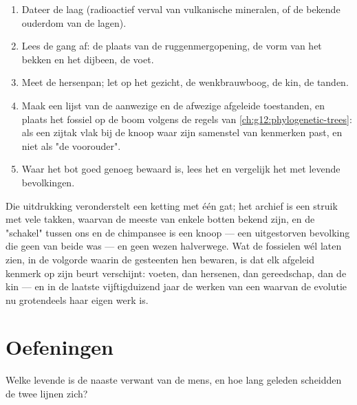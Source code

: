 \begin{method}\label{met:g12:human-evolution:placing}
\begin{enumerate}
  \item Dateer de laag (radioactief verval van vulkanische mineralen, of
        de bekende ouderdom van de lagen).
  \item Lees de gang af: de plaats van de ruggenmergopening, de vorm van
        het bekken en het dijbeen, de voet.
  \item Meet de hersenpan; let op het gezicht, de wenkbrauwboog, de kin,
        de tanden.
  \item Maak een lijst van de aanwezige en de afwezige afgeleide
        toestanden, en plaats het fossiel op de boom volgens de regels van
        \cref{ch:g12:phylogenetic-trees}: als een zijtak vlak bij de knoop
        waar zijn samenstel van kenmerken past, en niet als "de
        voorouder".
  \item Waar het bot goed genoeg bewaard is, lees het  en vergelijk
        het met levende bevolkingen.
\end{enumerate}
\end{method}

\begin{remark}\label{rem:g12:human-evolution:link}
Die uitdrukking veronderstelt een ketting met één gat; het archief is een
struik met vele takken, waarvan de meeste van enkele botten bekend zijn,
en de "schakel" tussen ons en de chimpansee is een knoop --- een
uitgestorven bevolking die geen van beide was --- en geen wezen halverwege.
Wat de fossielen wél laten zien, in de volgorde waarin de gesteenten hen
bewaren, is dat elk afgeleid kenmerk op zijn beurt verschijnt: voeten, dan
hersenen, dan gereedschap, dan de kin --- en in de laatste vijftigduizend
jaar de werken van een  waarvan de evolutie nu grotendeels haar eigen
werk is.
\end{remark}

\section{Oefeningen}

\begin{exercise}[$\star$]\label{exo:g12:human-evolution:1}
Welke levende  is de naaste verwant van de mens, en hoe lang geleden
scheidden de twee lijnen zich?
\end{exercise}

